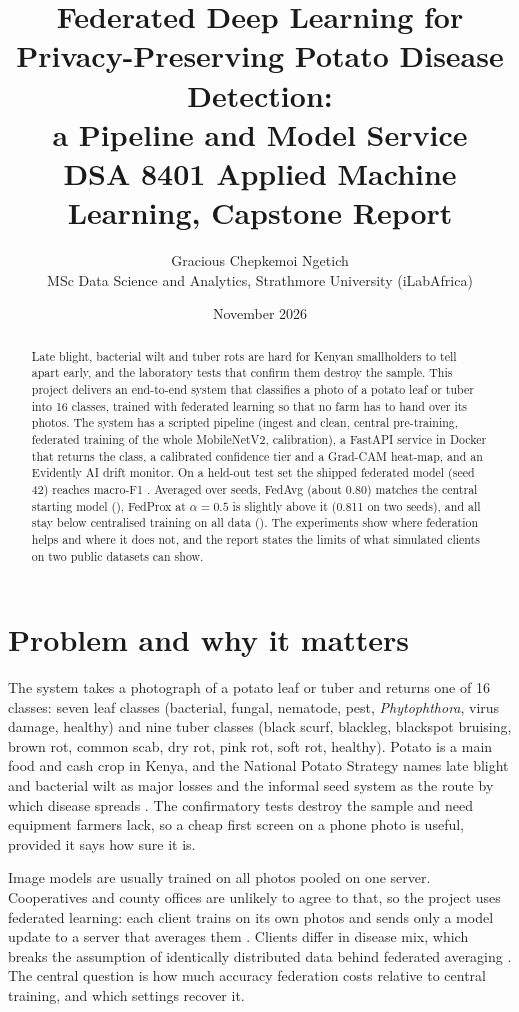 \documentclass[11pt,a4paper]{article}
\title{\textbf{Federated Deep Learning for Privacy-Preserving Potato Disease Detection:\\ a Pipeline and Model Service}\\[0.3em]\large DSA 8401 Applied Machine Learning, Capstone Report}
\author{Gracious Chepkemoi Ngetich\\MSc Data Science and Analytics, Strathmore University (iLabAfrica)}
\date{November 2026}
\begin{document}
\maketitle

\begin{abstract}
\noindent Late blight, bacterial wilt and tuber rots are hard for Kenyan smallholders to tell apart early, and the laboratory tests that confirm them destroy the sample. This project delivers an end-to-end system that classifies a photo of a potato leaf or tuber into 16 classes, trained with federated learning so that no farm has to hand over its photos. The system has a scripted pipeline (ingest and clean, central pre-training, federated training of the whole MobileNetV2, calibration), a FastAPI service in Docker that returns the class, a calibrated confidence tier and a Grad-CAM heat-map, and an Evidently AI drift monitor. On a held-out test set the shipped federated model (seed 42) reaches macro-F1 \MODELF. Averaged over seeds, FedAvg (about 0.80) matches the central starting model (\VZERO), FedProx at $\alpha=0.5$ is slightly above it (0.811 on two seeds), and all stay below centralised training on all data (\CENTRAL). The experiments show where federation helps and where it does not, and the report states the limits of what simulated clients on two public datasets can show.
\end{abstract}

\section{Problem and why it matters}
The system takes a photograph of a potato leaf or tuber and returns one of 16 classes: seven leaf classes (bacterial, fungal, nematode, pest, \emph{Phytophthora}, virus damage, healthy) and nine tuber classes (black scurf, blackleg, blackspot bruising, brown rot, common scab, dry rot, pink rot, soft rot, healthy). Potato is a main food and cash crop in Kenya, and the National Potato Strategy names late blight and bacterial wilt as major losses and the informal seed system as the route by which disease spreads \citep{potatos2021strategy}. The confirmatory tests destroy the sample and need equipment farmers lack, so a cheap first screen on a phone photo is useful, provided it says how sure it is.

Image models are usually trained on all photos pooled on one server. Cooperatives and county offices are unlikely to agree to that, so the project uses federated learning: each client trains on its own photos and sends only a model update to a server that averages them \citep{mcmahan2017communication}. Clients differ in disease mix, which breaks the assumption of identically distributed data behind federated averaging \citep{hsu2019measuring,li2020federated}. The central question is how much accuracy federation costs relative to central training, and which settings recover it.
\end{document}
